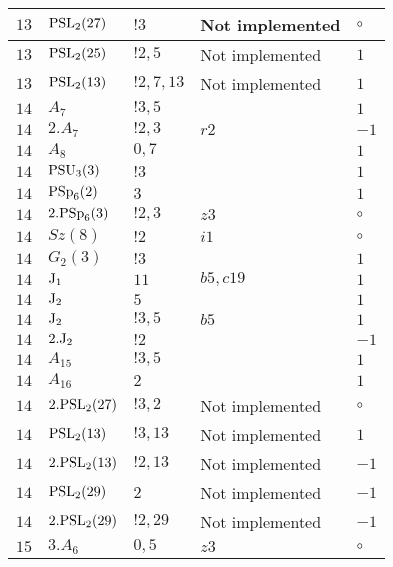 \documentclass[a4paper, 11pt]{article}
\begin{document}
\begin{longtable}{lllll}
        $ 13 $ & $ {\rm PSL}_{2}(27) $ & $ !3 $ &  Not implemented &  $\circ$ \\ \hline
        $ 13 $ & $ {\rm PSL}_{2}(25) $ & $ !2, 5 $ &  Not implemented & $ 1$ \\ \hline
        $ 13 $ & $ {\rm PSL}_{2}(13) $ & $ !2, 7, 13 $ &  Not implemented & $ 1$ \\ \hline
        $ 14 $ & $ A_{7} $ & $ ! 3,5 $ & $ ~ $ & $ 1$ \\ \hline
        $ 14 $ & $ 2.A_{7} $ & $ ! 2,3 $ & $ r2 $ & $ -1$ \\ \hline
        $ 14 $ & $ A_{8} $ & $ 0,7 $ & $ ~ $ & $ 1$ \\ \hline
        $ 14 $ & $ {\rm PSU}_{3}(3) $ & $ ! 3 $ & $ ~ $ & $ 1$ \\ \hline
        $ 14 $ & $ {\rm PSp}_{6}(2) $ & $ 3 $ & $ ~ $ & $ 1$ \\ \hline
        $ 14 $ & $ 2.{\rm PSp}_{6}(3) $ & $ ! 2,3 $ & $ z3 $ &  $\circ$ \\ \hline
        $ 14 $ & $ Sz(8) $ & $ ! 2 $ & $ i1 $ &  $\circ$ \\ \hline
        $ 14 $ & $ G_{2}(3) $ & $ ! 3 $ & $ ~ $ & $ 1$ \\ \hline
        $ 14 $ & $ {\rm J}_1 $ & $ 11 $ & $ b5, c19 $ & $ 1$ \\ \hline
        $ 14 $ & $ {\rm J}_2 $ & $ 5 $ & $ ~ $ & $ 1$ \\ \hline
        $ 14 $ & $ {\rm J}_2 $ & $ ! 3,5 $ & $ b5 $ & $ 1$ \\ \hline
        $ 14 $ & $ 2.{\rm J}_2 $ & $ ! 2 $ & $ ~ $ & $ -1$ \\ \hline
        $ 14 $ & $ A_{15} $ & $ !3, 5 $ & $ ~ $ & $ 1$ \\ \hline
        $ 14 $ & $ A_{16} $ & $ 2 $ & $ ~ $ & $ 1$ \\ \hline
        $ 14 $ & $ 2.{\rm PSL}_{2}(27) $ & $ !3, 2 $ &  Not implemented &  $\circ$ \\ \hline
        $ 14 $ & $ {\rm PSL}_{2}(13) $ & $ !3, 13 $ &  Not implemented & $ 1$ \\ \hline
        $ 14 $ & $ 2.{\rm PSL}_{2}(13) $ & $ !2, 13 $ &  Not implemented & $ -1$ \\ \hline
        $ 14 $ & $ {\rm PSL}_{2}(29) $ & $ 2 $ &  Not implemented & $ -1$ \\ \hline
        $ 14 $ & $ 2.{\rm PSL}_{2}(29) $ & $ !2, 29 $ &  Not implemented & $ -1$ \\ \hline
        $ 15 $ & $ 3.A_{6} $ & $ 0,5 $ & $ z3 $ &  $\circ$ \\ \hline

\end{longtable}
\end{document}
